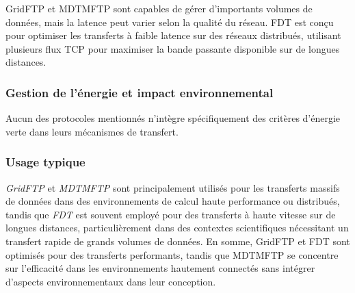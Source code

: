 GridFTP et MDTMFTP sont capables de gérer d'importants volumes de données, mais la latence peut varier selon la qualité du réseau. FDT est conçu pour optimiser les transferts à faible latence sur des réseaux distribués\cite{hp-transfer}, utilisant plusieurs flux TCP pour maximiser la bande passante disponible sur de longues distances.

\subsubsection{Gestion de l'énergie et impact environnemental}

Aucun des protocoles mentionnés n'intègre spécifiquement des critères d'énergie verte dans leurs mécanismes de transfert.

\subsubsection{Usage typique}

\textit{GridFTP} et \textit{MDTMFTP} sont principalement utilisés pour les transferts massifs de données dans des environnements de calcul haute performance ou distribués, tandis que \textit{FDT} est souvent employé pour des transferts à haute vitesse sur de longues distances, particulièrement dans des contextes scientifiques nécessitant un transfert rapide de grands volumes de données. En somme,  GridFTP et FDT sont optimisés pour des transferts performants, tandis que MDTMFTP se concentre sur l'efficacité dans les environnements hautement connectés sans intégrer d'aspects environnementaux dans leur conception.

